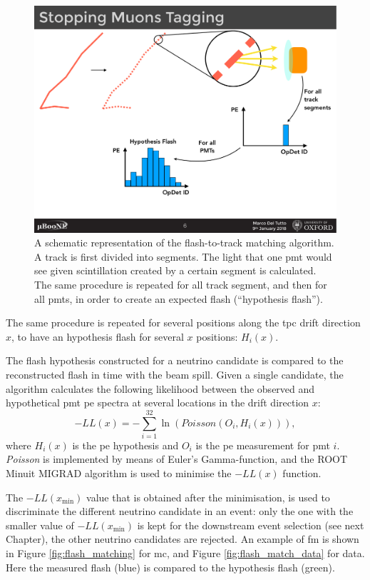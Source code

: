 \begin{figure}[]
\centering
\includegraphics[width=.95\textwidth]{images/FlashMatching/flash_matching_cartoon}
\caption[Flash-to-Track Matching Algorithm]{A schematic representation of the flash-to-track matching algorithm. A track is first divided into segments. The light that one \acrshort{pmt} would see given scintillation created by a certain segment is calculated. The same procedure is repeated for all track segment, and then for all \acrshort{pmt}s, in order to create an expected flash (``hypothesis flash'').}
\label{fig:flash_matching_cartoon}
\end{figure}
The same procedure is repeated for several positions along the \acrshort{tpc} drift direction $x$, to have an hypothesis flash for several $x$ positions: $H_i(x)$.

The flash hypothesis constructed for a neutrino candidate is compared to the reconstructed flash in time with the beam spill. Given a single candidate, the algorithm calculates the following likelihood between the observed and hypothetical \acrshort{pmt} \acrshort{pe} spectra at several locations in the drift direction $x$:
\begin{equation}
-LL(x) = - \sum_{i=1}^{32} \ln \left (  Poisson(O_i, H_i(x))  \right ),
\end{equation}
where $H_i(x)$ is the \acrshort{pe} hypothesis and $O_i$ is the \acrshort{pe} measurement for \acrshort{pmt} $i$. \emph{Poisson} is implemented by means of Euler's Gamma-function, and the ROOT Minuit MIGRAD algorithm is used to minimise the $-LL(x)$ function.

The $-LL(x_\text{min})$ value that is obtained after the minimisation, is used to discriminate the different neutrino candidate in an event: only the one with the smaller value of $-LL(x_\text{min})$ is kept for the downstream event selection (see next Chapter), the other neutrino candidates are rejected.
An example of \acrshort{fm} is shown in Figure \ref{fig:flash_matching} for \acrshort{mc}, and Figure \ref{fig:flash_match_data} for data. Here the measured flash (blue)
 is compared to the hypothesis flash (green). 

